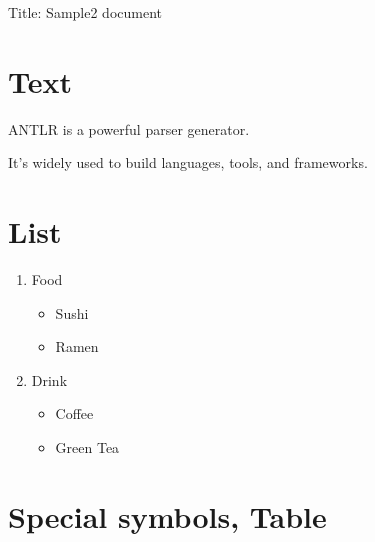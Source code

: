 \documentclass[pdflatex, a4paper, 10pt, jadriver=standard]{bxjsarticle}
\begin{document}
    
        {\Large Title: Sample2 document}\newline\newline

    

\section*{\Large Text}

	ANTLR is a powerful parser generator.
	\par

It's widely used to build languages, tools, and frameworks.
	
\par

\section*{\Large List}

    
\begin{enumerate}

     \item Food
		 
\begin{itemize}

			  \item Sushi
			  

\item Ramen
		

\end{itemize}
     

\item Drink
		 
\begin{itemize}

			  \item Coffee
			  

\item Green Tea
		

\end{itemize}
    

\end{enumerate}
	
	
\section*{\Large Special symbols, Table}
\end{document}

